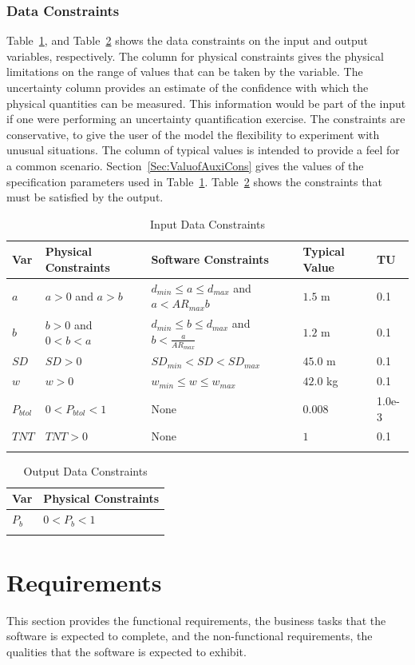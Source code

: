 \documentclass[12pt]{article}
\begin{document}
\subsubsection{Data Constraints}
\label{Sec:DataCons}
Table~\ref{Table:InpuDataCons}, and Table~\ref{Table:OutpDataCons} shows the data constraints on the input and output variables, respectively. The column for physical constraints gives the physical limitations on the range of values that can be taken by the variable. The uncertainty column provides an estimate of the confidence with which the physical quantities can be measured. This information would be part of the input if one were performing an uncertainty quantification exercise. The constraints are conservative, to give the user of the model the flexibility to experiment with unusual situations. The column of typical values is intended to provide a feel for a common scenario. Section~\ref{Sec:ValuofAuxiCons} gives the values of the specification parameters used in Table~\ref{Table:InpuDataCons}. Table~\ref{Table:OutpDataCons} shows the constraints that must be satisfied by the output.
\begin{longtable}{l l l l l}
\toprule
Var & Physical Constraints & Software Constraints & Typical Value & TU
\\
\midrule
$a$ & $a>0$ and $a>b$ & ${d_{min}}\leq{}a\leq{}{d_{max}}$ and $a<{AR_{max}} b$ & $1.5$ m & 0.1
\\
$b$ & $b>0$ and $0<b<a$ & ${d_{min}}\leq{}b\leq{}{d_{max}}$ and $b<\frac{a}{{AR_{max}}}$ & $1.2$ m & 0.1
\\
$SD$ & $SD>0$ & ${SD_{min}}<SD<{SD_{max}}$ & $45.0$ m & 0.1
\\
$w$ & $w>0$ & ${w_{min}}\leq{}w\leq{}{w_{max}}$ & $42.0$ kg & 0.1
\\
${P_{btol}}$ & $0<{P_{btol}}<1$ & None & $0.008$ & 1.0e-3
\\
$TNT$ & $TNT>0$ & None & $1$ & 0.1
\\
\bottomrule
\caption{Input Data Constraints}
\label{Table:InpuDataCons}
\end{longtable}
\begin{longtable}{l l}
\toprule
Var & Physical Constraints
\\
\midrule
${P_{b}}$ & $0<{P_{b}}<1$
\\
\bottomrule
\caption{Output Data Constraints}
\label{Table:OutpDataCons}
\end{longtable}
\section{Requirements}
\label{Sec:Requ}
This section provides the functional requirements, the business tasks that the software is expected to complete, and the non-functional requirements, the qualities that the software is expected to exhibit.
\end{document}

